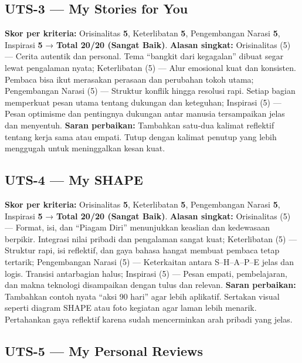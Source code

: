 \documentclass[
  letterpaper,
  DIV=11,
  numbers=noendperiod]{scrreprt}
\begin{document}
\subsection{UTS-3 --- My Stories for
You}\label{uts-3-my-stories-for-you}

\textbf{Skor per kriteria:} Orisinalitas \textbf{5}, Keterlibatan
\textbf{5}, Pengembangan Narasi \textbf{5}, Inspirasi \textbf{5} →
\textbf{Total 20/20 (Sangat Baik)}. \textbf{Alasan singkat:}
Orisinalitas (5) --- Cerita autentik dan personal. Tema ``bangkit dari
kegagalan'' dibuat segar lewat pengalaman nyata; Keterlibatan (5) ---
Alur emosional kuat dan konsisten. Pembaca bisa ikut merasakan perasaan
dan perubahan tokoh utama; Pengembangan Narasi (5) --- Struktur konflik
hingga resolusi rapi. Setiap bagian memperkuat pesan utama tentang
dukungan dan keteguhan; Inspirasi (5) --- Pesan optimisme dan pentingnya
dukungan antar manusia tersampaikan jelas dan menyentuh. \textbf{Saran
perbaikan:} Tambahkan satu-dua kalimat reflektif tentang kerja sama atau
empati. Tutup dengan kalimat penutup yang lebih menggugah untuk
meninggalkan kesan kuat.

\subsection{UTS-4 --- My SHAPE}\label{uts-4-my-shape}

\textbf{Skor per kriteria:} Orisinalitas \textbf{5}, Keterlibatan
\textbf{5}, Pengembangan Narasi \textbf{5}, Inspirasi \textbf{5} →
\textbf{Total 20/20 (Sangat Baik)}. \textbf{Alasan singkat:}
Orisinalitas (5) --- Format, isi, dan ``Piagam Diri'' menunjukkan
keaslian dan kedewasaan berpikir. Integrasi nilai pribadi dan pengalaman
sangat kuat; Keterlibatan (5) --- Struktur rapi, isi reflektif, dan gaya
bahasa hangat membuat pembaca tetap tertarik; Pengembangan Narasi (5)
--- Keterkaitan antara S--H--A--P--E jelas dan logis. Transisi
antarbagian halus; Inspirasi (5) --- Pesan empati, pembelajaran, dan
makna teknologi disampaikan dengan tulus dan relevan. \textbf{Saran
perbaikan:} Tambahkan contoh nyata ``aksi 90 hari'' agar lebih
aplikatif. Sertakan visual seperti diagram SHAPE atau foto kegiatan agar
laman lebih menarik. Pertahankan gaya reflektif karena sudah
mencerminkan arah pribadi yang jelas.

\subsection{UTS-5 --- My Personal
Reviews}\label{uts-5-my-personal-reviews}
\end{document}
